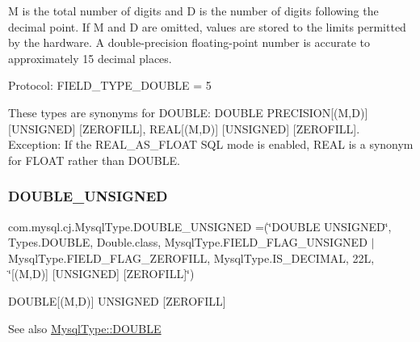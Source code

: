M is the total number of digits and D is the number of digits following the decimal point. If M and D are omitted, values are stored to the limits permitted by the hardware. A double-\/precision floating-\/point number is accurate to approximately 15 decimal places.

Protocol\+: F\+I\+E\+L\+D\+\_\+\+T\+Y\+P\+E\+\_\+\+D\+O\+U\+B\+LE = 5

These types are synonyms for D\+O\+U\+B\+LE\+: D\+O\+U\+B\+LE P\+R\+E\+C\+I\+S\+I\+ON\mbox{[}(M,D)\mbox{]} \mbox{[}U\+N\+S\+I\+G\+N\+ED\mbox{]} \mbox{[}Z\+E\+R\+O\+F\+I\+LL\mbox{]}, R\+E\+AL\mbox{[}(M,D)\mbox{]} \mbox{[}U\+N\+S\+I\+G\+N\+ED\mbox{]} \mbox{[}Z\+E\+R\+O\+F\+I\+LL\mbox{]}. Exception\+: If the R\+E\+A\+L\+\_\+\+A\+S\+\_\+\+F\+L\+O\+AT S\+QL mode is enabled, R\+E\+AL is a synonym for F\+L\+O\+AT rather than D\+O\+U\+B\+LE. \mbox{\label{enumcom_1_1mysql_1_1cj_1_1_mysql_type_a9ca99746f8ab3f53a3b0b9ad9599f5c0}} 
\subsubsection{\texorpdfstring{D\+O\+U\+B\+L\+E\+\_\+\+U\+N\+S\+I\+G\+N\+ED}{DOUBLE\_UNSIGNED}}
{\footnotesize\ttfamily com.\+mysql.\+cj.\+Mysql\+Type.\+D\+O\+U\+B\+L\+E\+\_\+\+U\+N\+S\+I\+G\+N\+ED =(\char`\"{}D\+O\+U\+B\+LE U\+N\+S\+I\+G\+N\+ED\char`\"{}, Types.\+D\+O\+U\+B\+LE, Double.\+class, Mysql\+Type.\+F\+I\+E\+L\+D\+\_\+\+F\+L\+A\+G\+\_\+\+U\+N\+S\+I\+G\+N\+ED $\vert$ Mysql\+Type.\+F\+I\+E\+L\+D\+\_\+\+F\+L\+A\+G\+\_\+\+Z\+E\+R\+O\+F\+I\+LL, Mysql\+Type.\+I\+S\+\_\+\+D\+E\+C\+I\+M\+AL, 22\+L, \char`\"{}\mbox{[}(\+M,\+D)\mbox{]} \mbox{[}\+U\+N\+S\+I\+G\+N\+E\+D\mbox{]} \mbox{[}\+Z\+E\+R\+O\+F\+I\+L\+L\mbox{]}\char`\"{})}

D\+O\+U\+B\+LE\mbox{[}(M,D)\mbox{]} U\+N\+S\+I\+G\+N\+ED \mbox{[}Z\+E\+R\+O\+F\+I\+LL\mbox{]}

\begin{DoxySeeAlso}{See also}
\mbox{\hyperlink{enumcom_1_1mysql_1_1cj_1_1_mysql_type_a3f95bc5758ff4e4f6ce9cd1fb1889400}{Mysql\+Type\+::\+D\+O\+U\+B\+LE}} 
\end{DoxySeeAlso}
\mbox{\label{enumcom_1_1mysql_1_1cj_1_1_mysql_type_a6173f156b78f3888f9c2073ccd3fda1a}} 
